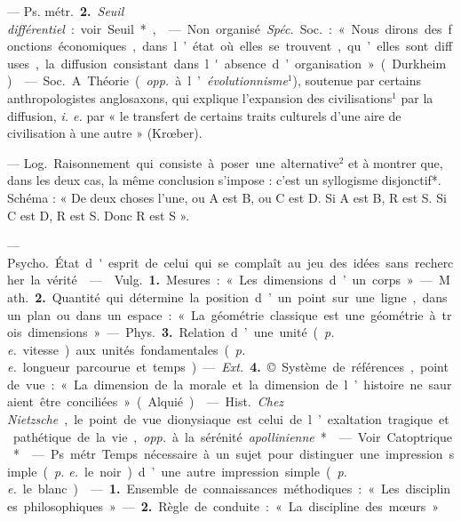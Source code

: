 \begin{itemize}[leftmargin=1cm, label=, itemsep=1pt]
— \si{Ps. métr.} {\bf 2.} {\it Seuil différentiel} :
voir Seuil*,

 — Non organisé. {\it Spéc.} \si{Soc.} :
« Nous dirons des fonctions économiques, dans l’état où elles se trouvent, qu’elles sont diffuses, la diffusion consistant dans l'absence d’organisation » (Durkheim).

 — \si{Soc.} A. Théorie
({\it opp.} à l’{\it évolutionnisme}$^1$), soutenue
par certains anthropologistes anglosaxons, qui explique l'expansion
des civilisations$^1$ par la diffusion,
{\it i. e.} par « le transfert de certains
traits culturels d'une aire de civilisation à une autre » (Krœber).

 — \si{Log.} Raisonnement qui
consiste à poser une alternative$^2$ et
à montrer que, dans les deux cas,
la même conclusion s'impose : c’est
un syllogisme disjonctif*. Schéma :
« De deux choses l’une, ou A est B,
ou C est D. Si A est B, R est S. Si
C est D, R est S. Donc R est S ».

 — \si{Psycho.} État d'esprit de celui qui se complaît au jeu
des idées sans rechercher la vérité.

 —  \si{Vulg.} {\bf 1.} Mesures :
« Les dimensions d’un corps ». —
\si{Math.} {\bf 2.} Quantité qui détermine
la position d’un point sur une ligne,
dans un plan ou dans un espace :
« La géométrie classique est une
géométrie à trois dimensions ». —
\si{Phys.} {\bf 3.} Relation d’une unité ({\it p. e.}
vitesse) aux unités fondamentales
({\it p. e.} longueur parcourue et temps).

— {\it Ext.} {\bf 4.} © Système de références, point de vue : « La dimension de la morale et la dimension
de l’histoire ne sauraient être conciliées » (Alquié).

 — \si{Hist.} {\it Chez Nietzsche},
le point de vue dionysiaque est celui
de l’exaltation tragique et pathétique de la vie, {\it opp.} à la sérénité
{\it apollinienne}*.

 — Voir Catoptrique*.

 — Ps.
métr. Temps nécessaire à un sujet
pour distinguer une impression
simple ({\it p. e.} le noir) d’une autre impression simple ({\it p. e.} le blanc).

 — {\bf 1.} Ensemble de connaissances méthodiques : « Les
disciplines philosophiques » — {\bf 2.}
Règle de conduite : « La discipline
des mœurs. »


\end{itemize}
